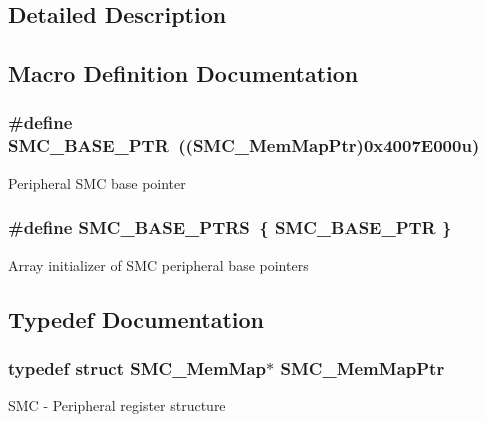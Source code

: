 \subsection{Detailed Description}


\subsection{Macro Definition Documentation}
\hypertarget{group___s_m_c___peripheral_ga31b6c4571795341e6446800243313e56}{}
\subsubsection[{S\+M\+C\+\_\+\+B\+A\+S\+E\+\_\+\+P\+T\+R}]{\setlength{\rightskip}{0pt plus 5cm}\#define S\+M\+C\+\_\+\+B\+A\+S\+E\+\_\+\+P\+T\+R~(({\bf S\+M\+C\+\_\+\+Mem\+Map\+Ptr})0x4007\+E000u)}\label{group___s_m_c___peripheral_ga31b6c4571795341e6446800243313e56}
Peripheral S\+M\+C base pointer \hypertarget{group___s_m_c___peripheral_gae583f3f0917ee513adcac36dd042a5f3}{}
\subsubsection[{S\+M\+C\+\_\+\+B\+A\+S\+E\+\_\+\+P\+T\+R\+S}]{\setlength{\rightskip}{0pt plus 5cm}\#define S\+M\+C\+\_\+\+B\+A\+S\+E\+\_\+\+P\+T\+R\+S~\{ {\bf S\+M\+C\+\_\+\+B\+A\+S\+E\+\_\+\+P\+T\+R} \}}\label{group___s_m_c___peripheral_gae583f3f0917ee513adcac36dd042a5f3}
Array initializer of S\+M\+C peripheral base pointers 

\subsection{Typedef Documentation}
\hypertarget{group___s_m_c___peripheral_ga763f87a6b8ebab7acb6dde639e6a47c7}{}
\subsubsection[{S\+M\+C\+\_\+\+Mem\+Map\+Ptr}]{\setlength{\rightskip}{0pt plus 5cm}typedef struct {\bf S\+M\+C\+\_\+\+Mem\+Map}$\ast$ {\bf S\+M\+C\+\_\+\+Mem\+Map\+Ptr}}\label{group___s_m_c___peripheral_ga763f87a6b8ebab7acb6dde639e6a47c7}
S\+M\+C -\/ Peripheral register structure 